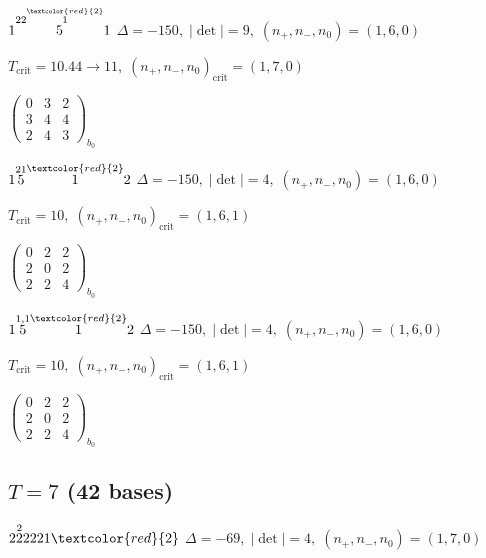 \documentclass[10pt]{article}
\begin{document}
\smallskip

$1\overset{22\overset{\textcolor{red}{2}}{1}}{5}1$ \quad $\Delta=-150,\; |\det|=9,\; (n_+,n_-,n_0)=(1,6,0)$

\hspace{1em}$T_{\text{crit}}=10.44 \to 11,\; (n_+,n_-,n_0)_{\text{crit}}=(1,7,0)$

\hspace{2em}$\left(\begin{smallmatrix}0 & 3 & 2 \\ 3 & 4 & 4 \\ 2 & 4 & 3\end{smallmatrix}\right)_{\!b_0}$

\smallskip

$1\overset{21}{5}\overset{\textcolor{red}{2}}{1}2$ \quad $\Delta=-150,\; |\det|=4,\; (n_+,n_-,n_0)=(1,6,0)$

\hspace{1em}$T_{\text{crit}}=10,\; (n_+,n_-,n_0)_{\text{crit}}=(1,6,1)$

\hspace{2em}$\left(\begin{smallmatrix}0 & 2 & 2 \\ 2 & 0 & 2 \\ 2 & 2 & 4\end{smallmatrix}\right)_{\!b_0}$

\smallskip

$1\overset{1,1}{5}\overset{\textcolor{red}{2}}{1}2$ \quad $\Delta=-150,\; |\det|=4,\; (n_+,n_-,n_0)=(1,6,0)$

\hspace{1em}$T_{\text{crit}}=10,\; (n_+,n_-,n_0)_{\text{crit}}=(1,6,1)$

\hspace{2em}$\left(\begin{smallmatrix}0 & 2 & 2 \\ 2 & 0 & 2 \\ 2 & 2 & 4\end{smallmatrix}\right)_{\!b_0}$


\subsection*{$T = 7$ \quad (42 bases)}
\smallskip

$2\overset{2}{2}2221\textcolor{red}{2}$ \quad $\Delta=-69,\; |\det|=4,\; (n_+,n_-,n_0)=(1,7,0)$
\end{document}
